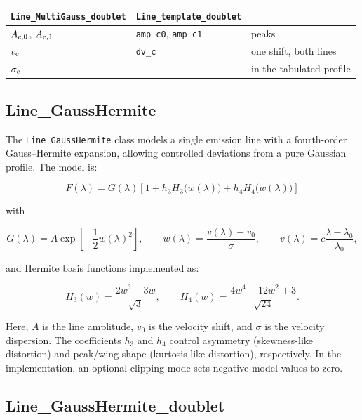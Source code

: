 \documentclass[11pt]{article}
\begin{document}
\begin{center}
\begin{tabular}{lll}
\hline
\texttt{Line\_MultiGauss\_doublet} & \texttt{Line\_template\_doublet} & \\
\hline
$A_{{\rm c},0}$, $A_{{\rm c},1}$ & \texttt{amp\_c0}, \texttt{amp\_c1} & peaks \\
$v_{\rm c}$ & \texttt{dv\_c} & one shift, both lines \\
$\sigma_{\rm c}$ & -- & in the tabulated profile \\
\hline
\end{tabular}
\end{center}

\subsection{Line\_GaussHermite}

The \texttt{Line\_GaussHermite} class models a single emission line with a fourth-order Gauss--Hermite expansion, allowing controlled deviations from a pure Gaussian profile. The model is:

\begin{equation}
F(\lambda) = G(\lambda)\left[1 + h_3 H_3\big(w(\lambda)\big) + h_4 H_4\big(w(\lambda)\big)\right]
\end{equation}

with

\begin{equation}
G(\lambda) = A\exp\left[-\frac{1}{2}w(\lambda)^2\right],
\qquad
w(\lambda) = \frac{v(\lambda)-v_0}{\sigma},
\qquad
v(\lambda)=c\frac{\lambda-\lambda_0}{\lambda_0},
\end{equation}

and Hermite basis functions implemented as:

\begin{equation}
H_3(w)=\frac{2w^3-3w}{\sqrt{3}},
\qquad
H_4(w)=\frac{4w^4-12w^2+3}{\sqrt{24}}.
\end{equation}

Here, $A$ is the line amplitude, $v_0$ is the velocity shift, and $\sigma$ is the velocity dispersion. The coefficients $h_3$ and $h_4$ control asymmetry (skewness-like distortion) and peak/wing shape (kurtosis-like distortion), respectively. In the implementation, an optional clipping mode sets negative model values to zero.

\subsection{Line\_GaussHermite\_doublet}
\end{document}
